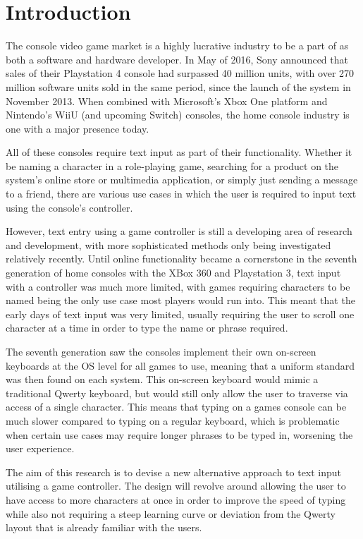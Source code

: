 \documentclass[requirements.tex]{subfiles}
\begin{document}
\section{Introduction} %
\label{sec:introduction}

The console video game market is a highly lucrative industry to be a part of as
both a software and hardware developer. In May of 2016, Sony announced that
sales of their Playstation 4 console had surpassed 40 million units, with over
270 million software units sold in the same period, since the launch of the
system in November 2013\cite{sony}. When combined with Microsoft's Xbox One
platform and Nintendo's WiiU (and upcoming Switch) consoles, the home console
industry is one with a major presence today.

All of these consoles require text input as part of their functionality. Whether
it be naming a character in a role-playing game, searching for a product on the
system's online store or multimedia application, or simply just sending a
message to a friend, there are various use cases in which the user is required
to input text using the console's controller.

However, text entry using a game controller is still a developing area of
research and development, with more sophisticated methods only being
investigated relatively recently. Until online functionality became a
cornerstone in the seventh generation of home consoles with the XBox 360 and
Playstation 3, text input with a controller was much more limited, with games
requiring characters to be named being the only use case most players would
run into. This meant that the early days of text input was very limited, usually
requiring the user to scroll one character at a time in order to type the name
or phrase required.

The seventh generation saw the consoles implement their own on-screen keyboards
at the OS level for all games to use, meaning that a uniform standard was then
found on each system. This on-screen keyboard would mimic a traditional Qwerty
keyboard, but would still only allow the user to traverse via access of a single
character. This means that typing on a games console can be much slower compared
to typing on a regular keyboard, which is problematic when certain use cases may
require longer phrases to be typed in, worsening the user experience.

The aim of this research is to devise a new alternative approach to text input
utilising a game controller. The design will revolve around allowing the user
to have access to more characters at once in order to improve the speed of
typing while also not requiring a steep learning curve or deviation from the
Qwerty layout that is already familiar with the users.
\end{document}
